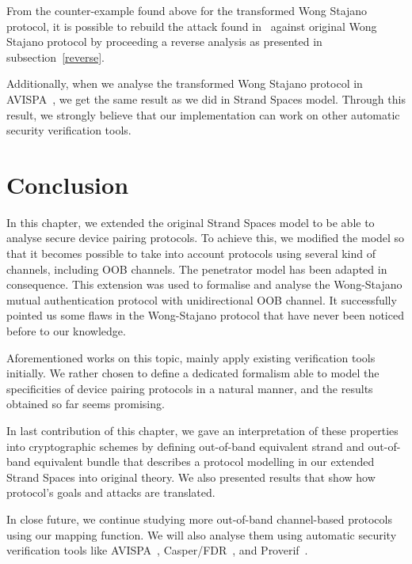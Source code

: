 From the counter-example found above for the transformed Wong Stajano protocol, it is possible to rebuild the attack found in~\cite{ttnguyen} against original Wong Stajano protocol by proceeding a reverse analysis as presented in subsection~\ref{reverse}. 

Additionally, when we analyse the transformed Wong Stajano protocol in AVISPA~\cite{Armando:2005:ATA:2153230.2153265}, we get the same result as we did in Strand Spaces model. Through this result, we strongly believe that our implementation can work on other automatic security verification tools. 

\section{Conclusion}

In this chapter, we extended the original Strand Spaces model to be able to analyse secure device pairing protocols. To achieve this, we modified the model so that it becomes possible to take into account protocols using several kind of channels, including OOB channels. The penetrator model has been adapted in consequence. This extension was used to formalise and analyse the Wong-Stajano mutual authentication protocol with unidirectional OOB channel. It successfully pointed us some flaws in the Wong-Stajano protocol that have never been noticed before to our knowledge. 
 
Aforementioned works on this topic, mainly apply existing verification tools initially. We rather chosen to define a dedicated formalism able to model the specificities of device pairing protocols in a natural manner, and the results obtained so far seems  promising. 

In last contribution of this chapter, we gave an interpretation of these properties into cryptographic schemes by defining out-of-band equivalent strand and out-of-band equivalent bundle that describes a protocol modelling in our extended Strand Spaces into original theory. We also presented results that show how protocol's goals and attacks are translated. 

In close future, we continue studying more out-of-band channel-based protocols using our mapping function. We will also analyse them using automatic security verification tools like AVISPA~\cite{Armando:2005:ATA:2153230.2153265}, Casper/FDR~\cite{596779}, and Proverif~\cite{Diaz2014149}. 
